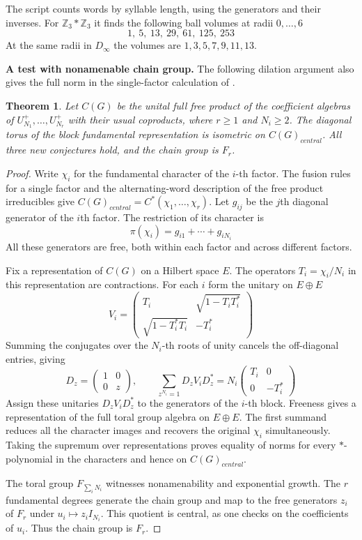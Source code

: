\documentclass[11pt,a4paper]{article}
\newtheorem{thm}{Theorem}[section]
\theoremstyle{remark}
\newcommand{\topic}[1]{\par\addvspace{1.0\baselineskip}\noindent\textbf{#1.}\enspace\ignorespaces}
\begin{document}
The script counts words by syllable length, using the generators and their
inverses. For $\mathbb Z_3*\mathbb Z_3$ it finds the following ball volumes
at radii $0,\ldots,6$
\[
 1,\ 5,\ 13,\ 29,\ 61,\ 125,\ 253
\]
At the same radii in $D_\infty$ the volumes are $1,3,5,7,9,11,13$.

\topic{A test with nonamenable chain group}
The following dilation argument also gives the full norm in the
single-factor calculation of \cite[Theorem~4.4]{bp}.

\begin{thm}\label{freeunitarytest}
Let $C(G)$ be the unital full free product of the coefficient
algebras of $U_{N_1}^+,\ldots,U_{N_r}^+$ with their usual coproducts,
where $r\ge1$ and $N_i\ge2$. The diagonal torus of the block
fundamental representation is isometric on $C(G)_{central}$. All three new
conjectures hold, and the chain group is $F_r$.
\end{thm}
\begin{proof}
Write $\chi_i$ for the fundamental character of the $i$-th factor.
The fusion rules for a single factor \cite[Theorem~6.20]{qg} and the
alternating-word description of the free product irreducibles
\cite[Theorem~3.10]{wangfree} give $C(G)_{central}=C^*(\chi_1,\ldots,\chi_r)$.
Let $g_{ij}$ be the $j$th diagonal generator of the $i$th factor. The
restriction of its character is
\[
 \pi(\chi_i)=g_{i1}+\cdots+g_{iN_i}
\]
All these generators are free, both within each factor and across
different factors.

Fix a representation of $C(G)$ on a Hilbert space $E$. The operators
$T_i=\chi_i/N_i$ in this representation are contractions. For each
$i$ form the unitary on $E\oplus E$
\[
 V_i=\begin{pmatrix}
 T_i&\sqrt{1-T_iT_i^*}\\
 \sqrt{1-T_i^*T_i}&-T_i^*
 \end{pmatrix}
\]
Summing the conjugates over the $N_i$-th roots of unity cancels the
off-diagonal entries, giving
\[
 D_z=\begin{pmatrix}1&0\\0&z\end{pmatrix},\qquad
 \sum_{z^{N_i}=1}D_zV_iD_z^*
 =N_i\begin{pmatrix}T_i&0\\0&-T_i^*\end{pmatrix}
\]
Assign these unitaries $D_zV_iD_z^*$ to
the generators of the $i$-th block. Freeness gives a representation of
the full toral group algebra on $E\oplus E$. The first summand reduces
all the character images and recovers the original $\chi_i$
simultaneously. Taking the supremum over representations proves equality
of norms for every $*$-polynomial in the characters and hence on $C(G)_{central}$.

The toral group $F_{\sum_i N_i}$ witnesses nonamenability and exponential
growth. The $r$ fundamental degrees generate the chain group and map to
the free generators $z_i$ of $F_r$ under $u_i\mapsto z_i I_{N_i}$.
This quotient is central, as one checks on the coefficients of $u_i$.
Thus the chain group is $F_r$.
\end{proof}
\end{document}

